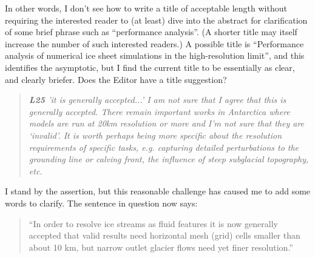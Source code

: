 \documentclass[letterpaper,final,12pt,reqno]{amsart}
\newenvironment{review}%
{\bigskip \par \begin{quote} \selectfont \sl}%
{\end{quote}}
\begin{document}
In other words, I don't see how to write a title of acceptable length without requiring the interested reader to (at least) dive into the abstract for clarification of some brief phrase such as ``performance analysis''.  (A shorter title may itself increase the number of such interested readers.)  A possible title is ``Performance analysis of numerical ice sheet simulations in the high-resolution limit'', and this identifies the asymptotic, but I find the current title to be essentially as clear, and clearly briefer.  Does the Editor have a title suggestion?

\begin{review}
\textbf{L25} 'it is generally accepted...'  I am not sure that I agree that this is generally accepted.  There remain important works in Antarctica where models are run at 20km resolution or more and I’m not sure that they are ‘invalid’.  It is worth perhaps being more specific about the resolution requirements of specific tasks, e.g. capturing detailed perturbations to the grounding line or calving front, the influence of steep subglacial topography, etc.
\end{review}

\noindent I stand by the assertion, but this reasonable challenge has caused me to add some words to clarify.  The sentence in question now says:

\begin{quote}``In order to resolve ice streams as fluid features it is now generally accepted that valid results need horizontal mesh (grid) cells smaller than about 10 km, but narrow outlet glacier flows need yet finer resolution.''\end{quote}
\end{document}
